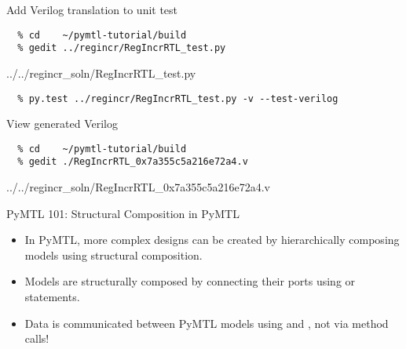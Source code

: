 \begin{task}\begin{frame}[fragile]{Add Verilog translation to unit test}
\vspace{-0.25in}
\begin{verbatim}
  % cd    ~/pymtl-tutorial/build
  % gedit ../regincr/RegIncrRTL_test.py
\end{verbatim}

\vspace{-0.3in}
%
{../../regincr_soln/RegIncrRTL_test.py}

\vspace{-0.3in}
\begin{verbatim}
  % py.test ../regincr/RegIncrRTL_test.py -v --test-verilog
\end{verbatim}

\end{frame}
\end{task}

\begin{task}\begin{frame}[fragile]{View generated Verilog}
\vspace{-0.25in}
\begin{verbatim}
  % cd    ~/pymtl-tutorial/build
  % gedit ./RegIncrRTL_0x7a355c5a216e72a4.v
\end{verbatim}

\vspace{-0.3in}
%
{../../regincr_soln/RegIncrRTL_0x7a355c5a216e72a4.v}

\end{frame}
\end{task}

\begin{frame}{PyMTL 101: Structural Composition in PyMTL}
\begin{itemize}
  \item In PyMTL, more complex designs can be created by hierarchically
        composing models using structural composition.
  \smallskip
  \item Models are structurally composed by connecting their ports using
         or  statements.
  \smallskip
  \item Data is communicated between PyMTL models using  and
        , not via method calls!
\end{itemize}
\end{frame}

